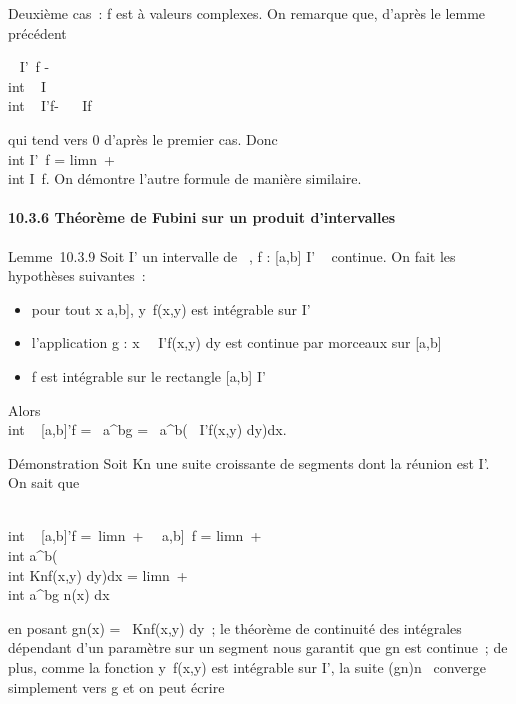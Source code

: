 Deuxième cas~: f est à valeurs complexes. On remarque que, d'après le
lemme précédent

\left \textbar{}\int ~
\int  I\timesI'~f -\\int
 \int ~
I\timesKnf\right
\textbar{}\leq\int  \\int ~
I\timesI'\textbar{}f\textbar{}-\int ~
\int ~
I\timesKn\textbar{}f\textbar{}

qui tend vers 0 d'après le premier cas. Donc \\int
 \int  I\timesI'~f
= limn\rightarrow~+\infty~~\\int
 \int  I\timesKn~f. On démontre
l'autre formule de manière similaire.

\paragraph{10.3.6 Théorème de Fubini sur un produit d'intervalles}

Lemme~10.3.9 Soit I' un intervalle de ~, f : {[}a,b{]} \times I' \rightarrow~ 
continue. On fait les hypothèses suivantes~:

\begin{itemize}
\itemsep1pt\parskip0pt
\item
  pour tout x \in {[}a,b{]}, y\mapsto~f(x,y) est
  intégrable sur I'
\item
  l'application g :
  x\mapsto~\int ~
  I'f(x,y) dy est continue par morceaux sur {[}a,b{]}
\item
  f est intégrable sur le rectangle {[}a,b{]} \times I'
\end{itemize}

Alors \int  \\int ~
{[}a,b{]}\timesI'f =\int ~
a^bg =\int ~
a^b\left (\int ~
I'f(x,y) dy\right )dx.

Démonstration Soit Kn une suite croissante de segments dont la
réunion est I'. On sait que

\int  \\int ~
{[}a,b{]}\timesI'f =\
limn\rightarrow~+\infty~\int ~
\int  {[}a,b{]}\timesKn~f
= limn\rightarrow~+\infty~~\\int
 a^b\left (\\int
 Knf(x,y) dy\right )dx
= limn\rightarrow~+\infty~~\\int
 a^bg n(x) dx

en posant gn(x) =\int ~
Knf(x,y) dy~; le théorème de continuité des intégrales
dépendant d'un paramètre sur un segment nous garantit que gn
est continue~; de plus, comme la fonction
y\mapsto~f(x,y) est intégrable sur I', la suite
(gn)n\in{}~ converge simplement vers g et on peut écrire

